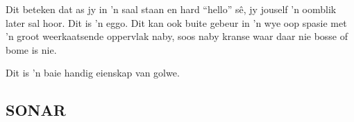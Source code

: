 Dit beteken dat as jy in  'n saal staan en hard ``hello'' s\^e, jy jouself  'n oomblik later sal hoor. Dit is  'n eggo. Dit kan ook buite gebeur in  'n wye oop spasie met  'n groot weerkaatsende oppervlak naby, soos naby kranse waar daar nie bosse of bome is nie.

Dit is  'n baie handig eienskap van golwe.

         \subsection*{SONAR}
            \nopagebreak
      \label{m38800*id185202}
\begin{minipage}{.5\textwidth}
      	\begin{figure}[H] %
    \begin{center}


\end{center}
\end{figure}
\end{minipage}
